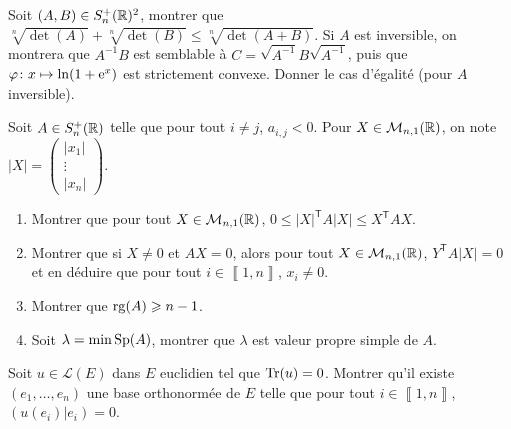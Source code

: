 \documentclass[12pt]{article}
\begin{document}
\begin{exercise}
	Soit $(A,B)\in S_n^{+}(\mathbb{R})^{2}$, montrer que $\sqrt[n]{\det(A)}+\sqrt[n]{\det(B)}\leqslant\sqrt[n]{\det(A+B)}$. Si $A$ est inversible, on montrera que $A^{-1}B$ est semblable à $C=\sqrt{A^{-1}}B\sqrt{A^{-1}}$, puis que $\varphi\colon x\mapsto\ln(1+\mathrm{e}^{x})$ est strictement convexe. Donner le cas d'égalité (pour $A$ inversible).
\end{exercise}

\begin{exercise}
	Soit $A\in S_n^{+}(\mathbb{R})$ telle que pour tout $i\neq j$, $a_{i,j}<0$. Pour $X\in\mathcal{M}_{n,1}(\mathbb{R})$, on note $\left\lvert X\right\rvert=\begin{pmatrix}
		\left\lvert x_1\right\rvert\\\vdots\\\left\lvert x_n\right\rvert
	\end{pmatrix}$.
	\begin{enumerate}
		\item Montrer que pour tout $X\in\mathcal{M}_{n,1}(\mathbb{R})$, $0\leqslant\left\lvert X\right\rvert^{\mathsf{T}}A\left\lvert X\right\rvert\leqslant X^{\mathsf{T}}AX$.
		\item Montrer que si $X\neq0$ et $AX=0$, alors pour tout $X\in\mathcal{M}_{n,1}(\mathbb{R})$, $Y^{\mathsf{T}}A\left\lvert X\right\rvert=0$ et en déduire que pour tout $i\in\left\llbracket1,n\right\rrbracket$, $x_i\neq0$.
		\item Montrer que $\operatorname{rg}(A)\geqslant n-1$.
		\item Soit $\lambda=\min\operatorname{Sp}(A)$, montrer que $\lambda$ est valeur propre simple de $A$.
	\end{enumerate}
\end{exercise}

\begin{exercise}
	Soit $u\in\mathcal{L}(E)$ dans $E$ euclidien tel que $\operatorname{Tr}(u)=0$. Montrer qu'il existe $(e_{1},\dots,e_n)$ une base orthonormée de $E$ telle que pour tout $i\in\left\llbracket1,n\right\rrbracket$, $(u(e_i)|e_i)=0$.
\end{exercise}
\end{document}
